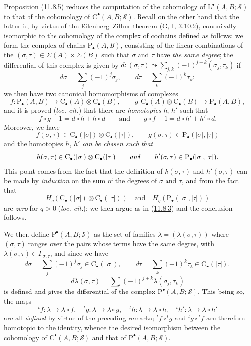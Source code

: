 \begin{env}[11.8.6]
\label{0.11.8.6}
Proposition (\hyperref[0.11.8.5]{11.8.5}) reduces the computation of the
cohomology of $\mathrm L^\bullet(A,B;\mathscr S)$ to that of the cohomology of
$\mathrm C^\bullet(A,B;\mathscr S)$. Recall on the other hand that the latter
is, by virtue of the Eilenberg--Zilber theorem (G, I, 3.10.2), canonically
isomorphic to the cohomology of the complex of cochains defined as follows:
we form the complex of chains $\mathrm P_\bullet(A,B)$, consisting of the
linear combinations of the $(\sigma,\tau)\in\Sigma(A)\times\Sigma(B)$ such
that $\sigma$ and $\tau$ have \emph{the same degree}; the differential of this
complex is given by $d:(\sigma,\tau)\leadsto\sum_{j,k}(-1)^{j+k}(\sigma_j,\tau_k)$
if
\[
d\sigma=\sum_j(-1)^j\sigma_j,\qquad
d\tau=\sum_k(-1)^k\tau_k;
\]
we then have two canonical homomorphisms of complexes
\[
f:\mathrm P_\bullet(A,B)\longrightarrow
\mathrm C_\bullet(A)\otimes\mathrm C_\bullet(B),\qquad
g:\mathrm C_\bullet(A)\otimes\mathrm C_\bullet(B)
\longrightarrow\mathrm P_\bullet(A,B),
\]
and it is proved (\emph{loc. cit.}) that there are \emph{homotopies} $h$, $h'$ such
that
\[
f\circ g-1=d\circ h+h\circ d\qquad\text{and}\qquad
g\circ f-1=d\circ h'+h'\circ d.
\]
Moreover, we have
\[
f(\sigma,\tau)\in\mathrm C_\bullet(|\sigma|)
\otimes\mathrm C_\bullet(|\tau|),\qquad
g(\sigma,\tau)\in\mathrm P_\bullet(|\sigma|,|\tau|)
\]
and the homotopies $h$, $h'$ \emph{can be chosen such that}
\[
h(\sigma,\tau)\in\mathrm C_\bullet(|\sigma|)
\otimes\mathrm C_\bullet(|\tau|)\qquad\text{\emph{and}}\qquad
h'(\sigma,\tau)\in\mathrm P_\bullet(|\sigma|,|\tau|).
\]
This point comes from the fact that the definition of $h(\sigma,\tau)$ and
$h'(\sigma,\tau)$ can be made by \emph{induction} on the sum of the degrees of
$\sigma$ and $\tau$, and from the fact that
\[
H_q(\mathrm C_\bullet(|\sigma|)\otimes\mathrm C_\bullet(|\tau|))
\quad\text{and}\quad
H_q(\mathrm P_\bullet(|\sigma|,|\tau|))
\]
are \emph{zero} for $q>0$ (\emph{loc. cit.}); we then argue as in
(\hyperref[0.11.8.3]{11.8.3}) and the conclusion follows.

We then define $\mathrm P^\bullet(A,B;\mathscr S)$ as the set of
families $\lambda=(\lambda(\sigma,\tau))$ where $(\sigma,\tau)$ ranges over
the pairs whose terms have the same degree, with
$\lambda(\sigma,\tau)\in\Gamma_{\sigma,\tau}$, and since we have
\[
d\sigma=\sum_j(-1)^j\sigma_j\in\mathrm C_\bullet(|\sigma|),\qquad
d\tau=\sum_k(-1)^k\tau_k\in\mathrm C_\bullet(|\tau|),
\]
\[
d\lambda(\sigma,\tau)=
\sum(-1)^{j+k}\lambda(\sigma_j,\tau_k)
\]
is defined and gives the differential of the complex
$\mathrm P^\bullet(A,B;\mathscr S)$. This being so, the maps
\[
{}^tf:\lambda\to\lambda\circ f,\quad
{}^tg:\lambda\to\lambda\circ g,\quad
{}^th:\lambda\to\lambda\circ h,\quad
{}^th':\lambda\to\lambda\circ h'
\]
are all \emph{defined} by virtue of the preceding remarks;
${}^tf\circ{}^tg$ and ${}^tg\circ{}^tf$ are therefore homotopic to
the identity, whence the desired isomorphism between the cohomology of
$\mathrm C^\bullet(A,B;\mathscr S)$ and that of
$\mathrm P^\bullet(A,B;\mathscr S)$.
\end{env}

